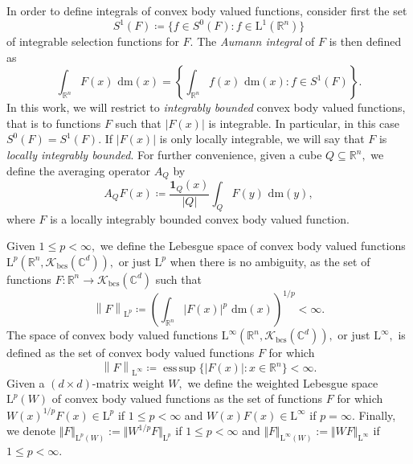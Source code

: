 \documentclass{article}
\theoremstyle{definition}
\theoremstyle{remark}
\numberwithin{equation}{section}
\DeclareMathOperator*{\esssup}{ess\,sup}
\newcommand{\norm}[2]{\left\|{#1}\right\|_{{#2}}}
\newcommand{\mathdm}{\,\mathrm{dm}}
\newcommand{\cK}{\mathcal{K}}
\newcommand{\reals}{\mathbb{R}}
\newcommand{\complex}{\mathbb{C}}
\newcommand{\convex}{\cK_{\mathrm{bcs}}}
\newcommand{\Lp}[1]{\mathrm{L}^{#1}}
\newcommand{\1}{\mathbf{1}}
\begin{document}
    In order to define integrals of convex body valued functions, consider first the set
    \begin{equation*}
        S^1(F) \coloneq \{f \in S^0(F)\colon f \in \Lp{1}(\reals^n)\}
    \end{equation*}
    of integrable selection functions for $F.$
    The \emph{Aumann integral} of $F$ is then defined as
    \begin{equation*}
        \int_{\reals^n} F(x)\, \mathdm(x) = \left\{\int_{\reals^n} f(x)\, \mathdm(x)\colon f \in S^1(F)\right\}.
    \end{equation*}
    In this work, we will restrict to \emph{integrably bounded} convex body valued functions,
    that is to functions $F$ such that $|F(x)|$ is integrable.
    In particular, in this case $S^0(F) = S^1(F).$
    If $|F(x)|$ is only locally integrable, we will say that $F$ is \emph{locally integrably bounded}.
    For further convenience, given a cube $Q \subseteq \reals^n,$ we define the averaging operator $A_Q$ by
    \begin{equation*}
        A_QF(x) \coloneq \frac{\1_Q(x)}{|Q|} \int_{Q} F(y)\, \mathdm(y),
    \end{equation*}
    where $F$ is a locally integrably bounded convex body valued function.

    Given $1 \leq p < \infty,$ we define the Lebesgue space of convex body valued functions $\Lp{p}(\reals^n,\convex(\complex^d)),$
    or just $\Lp{p}$ when there is no ambiguity, as the set of functions $F\colon \reals^n \rightarrow \convex(\complex^d)$ such that
    \begin{equation*}
        \norm{F}{\Lp{p}} \coloneq \left(\int_{\reals^n}|F(x)|^p\, \mathdm(x)\right)^{1/p} < \infty.
    \end{equation*}
    The space of convex body valued functions $\Lp{\infty}(\reals^n,\convex(\complex^d)),$ or just $\Lp{\infty},$ is defined as
    the set of convex body valued functions $F$ for which
    \begin{equation*}
        \norm{F}{\Lp{\infty}} \coloneq \esssup \{|F(x)|\colon x \in \reals^n\} < \infty.
    \end{equation*}
    Given a $(d \times d)$-matrix weight $W,$ we define the weighted Lebesgue space $\Lp{p}(W)$ of convex body valued functions
    as the set of functions $F$ for which $W(x)^{1/p} F(x) \in \Lp{p}$ if $1\leq p<\infty$ and $W(x)F(x)\in\Lp{\infty}$ if $p=\infty$. Finally, we denote $\Vert F\Vert_{\Lp{p}(W)} := \Vert W^{1/p} F\Vert_{\Lp{p}}$ if $1\leq p<\infty$ and $\Vert F\Vert_{\Lp{\infty}(W)} := \Vert W F\Vert_{\Lp{\infty}}$ if $1\leq p<\infty$.
\end{document}
